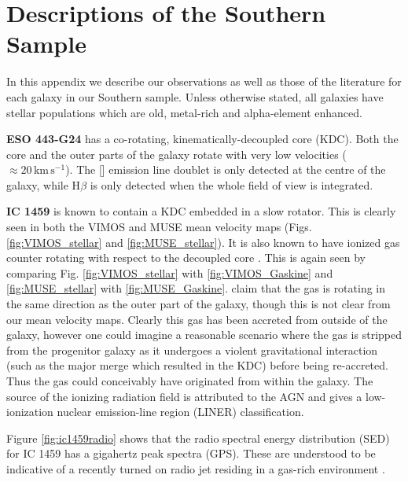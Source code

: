 \chapter{Descriptions of the Southern Sample}
	\label{cha:Description}
In this appendix we describe our observations as well as those of the literature for each galaxy in our Southern sample. Unless otherwise stated, all galaxies have stellar populations which are old, metal-rich and alpha-element enhanced.

\textbf{ESO 443-G24} has a co-rotating, kinematically-decoupled core (KDC). Both the core and the outer parts of the galaxy rotate with very low velocities ($\approx 20\,\mathrm{km\,s^{-1}}$). The [] emission line doublet is only detected at the centre of the galaxy, while H$\beta$ is only detected when the whole field of view is integrated. 

\textbf{IC 1459} is known to contain a KDC \citep{Franx1988} embedded in a slow rotator. This is clearly seen in both the VIMOS and MUSE mean velocity maps (Figs. \ref{fig:VIMOS_stellar} and \ref{fig:MUSE_stellar}). It is also known to have ionized gas counter rotating with respect to the decoupled core \citep{VerdoesKleijn2000}. This is again seen by comparing Fig. \ref{fig:VIMOS_stellar} with \ref{fig:VIMOS_Gaskine} and \ref{fig:MUSE_stellar} with \ref{fig:MUSE_Gaskine}. \citet{Franx1988} claim that the gas is rotating in the same direction as the outer part of the galaxy, though this is not clear from our mean velocity maps. Clearly this gas has been accreted from outside of the galaxy, however one could imagine a reasonable scenario where the gas is stripped from the progenitor galaxy as it undergoes a violent gravitational interaction (such as the major merge which resulted in the KDC) before being re-accreted. Thus the gas could conceivably have originated from within the galaxy. The source of the ionizing radiation field is attributed to the AGN and gives a low-ionization nuclear emission-line region (LINER) classification.

Figure \ref{fig:ic1459radio} shows that the radio spectral energy distribution (SED) for IC 1459 has a gigahertz peak spectra (GPS). These are understood to be indicative of a recently turned on radio jet residing in a gas-rich environment \citep[e.g.][]{ODea1998}. 

